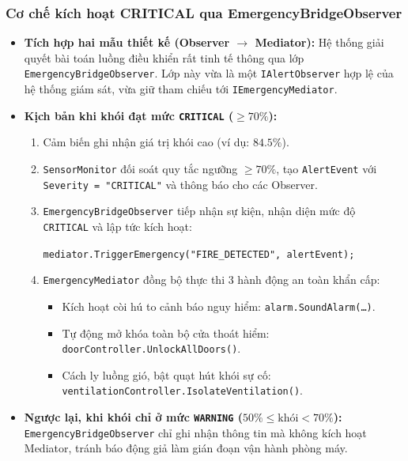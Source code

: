 \documentclass[11pt,a4paper]{article}
\begin{document}
\subsubsection{Cơ chế kích hoạt CRITICAL qua EmergencyBridgeObserver}
\begin{itemize}[itemsep=1.2pt]
    \item \textbf{Tích hợp hai mẫu thiết kế (Observer $\rightarrow$ Mediator):} Hệ thống giải quyết bài toán luồng điều khiển rất tinh tế thông qua lớp \texttt{EmergencyBridgeObserver}. Lớp này vừa là một \texttt{IAlertObserver} hợp lệ của hệ thống giám sát, vừa giữ tham chiếu tới \texttt{IEmergencyMediator}.
    \item \textbf{Kịch bản khi khói đạt mức \texttt{CRITICAL} ($\ge 70\%$):}
    \begin{enumerate}
        \item Cảm biến ghi nhận giá trị khói cao (ví dụ: $84.5\%$).
        \item \texttt{SensorMonitor} đối soát quy tắc ngưỡng $\ge 70\%$, tạo \texttt{AlertEvent} với \texttt{Severity = "CRITICAL"} và thông báo cho các Observer.
        \item \texttt{EmergencyBridgeObserver} tiếp nhận sự kiện, nhận diện mức độ \texttt{CRITICAL} và lập tức kích hoạt:
        \begin{center}
            \texttt{mediator.TriggerEmergency("FIRE\_DETECTED", alertEvent);}
        \end{center}
        \item \texttt{EmergencyMediator} đồng bộ thực thi 3 hành động an toàn khẩn cấp:
        \begin{itemize}
            \item Kích hoạt còi hú to cảnh báo nguy hiểm: \texttt{alarm.SoundAlarm(\dots)}.
            \item Tự động mở khóa toàn bộ cửa thoát hiểm: \texttt{doorController.UnlockAllDoors()}.
            \item Cách ly luồng gió, bật quạt hút khói sự cố: \texttt{ventilationController.IsolateVentilation()}.
        \end{itemize}
    \end{enumerate}
    \item \textbf{Ngược lại, khi khói chỉ ở mức \texttt{WARNING} ($50\% \le \text{khói} < 70\%$):} \texttt{EmergencyBridgeObserver} chỉ ghi nhận thông tin mà không kích hoạt Mediator, tránh báo động giả làm gián đoạn vận hành phòng máy.
\end{itemize}
\end{document}
